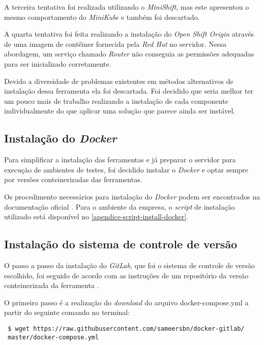 \documentclass[
	12pt,				%
	openright,			%
	oneside,			%
	a4paper,			%
	english,			%
	french,				%
	spanish,			%
	brazil,				%
	]{abntex2}
\begin{document}
A terceira tentativa foi realizada utilizando o \textit{MiniShift}, mas este apresentou o mesmo comportamento do \textit{MiniKube} e também foi descartado.

A quarta tentativa foi feita realizando a instalação do \textit{Open Shift Origin} através de uma imagem de contêiner fornecida pela \textit{Red Hat} no servidor\cite{OpenShift:InstallGuide}. Nessa abordagem, um serviço chamado \textit{Router} não conseguia as permissões adequadas para ser inicializado corretamente. 

Devido a diversidade de problemas existentes em métodos alternativos de instalação dessa ferramenta ela foi descartada. Foi decidido que seria melhor ter um pouco mais de trabalho realizando a instalação de cada componente individualmente do que aplicar uma solução que parece ainda ser instável.

\subsection{Instalação do \textit{Docker}}

Para simplificar a instalação das ferramentas e já preparar o servidor para execução de ambientes de testes, foi decidido instalar o \textit{Docker} e optar sempre por versões conteinerizadas das ferramentas.

Os procedimento necessários para instalação do \textit{Docker} podem ser encontrados na documentação oficial \cite{Docker:InstallGuide}. Para o ambiente da empresa, o \textit{script} de instalação utilizado está disponível no \autoref{apendice-script-install-docker}.

\subsection{Instalação do sistema de controle de versão}

O passo a passo da instalação do \textit{GitLab}, que foi o sistema de controle de versão escolhido, foi seguido de acordo com as instruções de um repositório da versão conteinerizada da ferramenta \cite{GitHub:GitLabDocker}.

O primeiro passo é a realização do \textit{download} do arquivo docker-compose.yml a partir do seguinte comando no terminal:

 \begin{lstlisting}
 $ wget https://raw.githubusercontent.com/sameersbn/docker-gitlab/
 master/docker-compose.yml
 \end{lstlisting}
 
\end{document}
